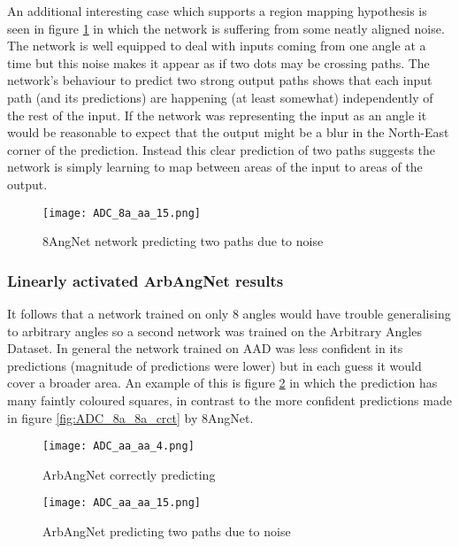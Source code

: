 An additional interesting case which supports a region mapping hypothesis is seen in figure \ref{fig:ADC_8aNoaa_special} in which the network is suffering from some neatly aligned noise. 
The network is well equipped to deal with inputs coming from one angle at a time but this noise makes it appear as if two dots may be crossing paths. 
The network's behaviour to predict two strong output paths shows that each input path (and its predictions) are happening (at least somewhat) independently of the rest of the input.
If the network was representing the input as an angle it would be reasonable to expect that the output might be a blur in the North-East corner of the prediction.  
Instead this clear prediction of two paths suggests the network is simply learning to map between areas of the input to areas of the output. 

\begin{figure}
    \centering
    \texttt{[image: ADC\_8a\_aa\_15.png]}
    \caption{8AngNet network predicting two paths due to noise}
    \label{fig:ADC_8aNoaa_special}
\end{figure}


\subsubsection{Linearly activated ArbAngNet results}
It follows that a network trained on only 8 angles would have trouble generalising to arbitrary angles so a second network was trained on the Arbitrary Angles Dataset. 
In general the network trained on AAD was less confident in its predictions (magnitude of predictions were lower) but in each guess it would cover a broader area. 
An example of this is figure \ref{fig:ADC_aaaa_crct} in which the prediction has many faintly coloured squares, in contrast to the more confident predictions made in figure \ref{fig:ADC_8a_8a_crct} by 8AngNet.

\begin{figure}[h]
    \centering
    \texttt{[image: ADC\_aa\_aa\_4.png]}
    \caption{ArbAngNet correctly predicting}
    \label{fig:ADC_aaaa_crct}
\end{figure}

\begin{figure}[h]
    \centering
    \texttt{[image: ADC\_aa\_aa\_15.png]}
    \caption{ArbAngNet predicting two paths due to noise}
    \label{fig:ADC_aaaa_twopath}
\end{figure}

